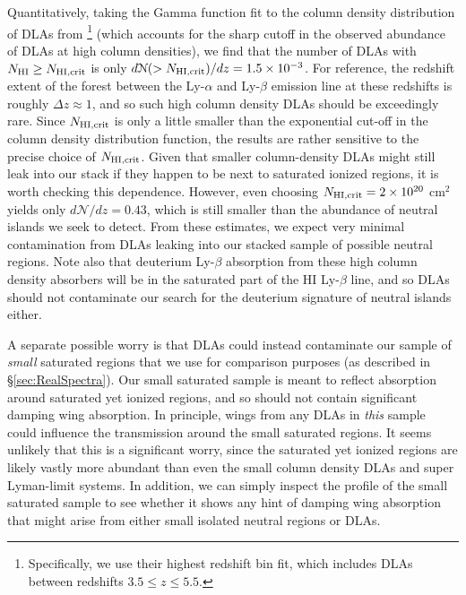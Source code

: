 Quantitatively, taking the Gamma function
fit to the column density distribution of DLAs from \citet{Prochaska:2005wy} \footnote{Specifically, we use their highest redshift bin fit, 
which includes DLAs between redshifts $3.5 \leq z \leq 5.5$.} 
(which accounts for the sharp cutoff in the observed abundance of DLAs
at high column densities), we find that the number of DLAs with $N_{\rm HI} \geq N_{\rm HI, crit}$ is only
$d\mathcal{N}(> N_{\rm HI, crit})/dz = 1.5 \times 10^{-3}$. For reference, the redshift extent of the forest 
between the Ly-$\alpha$ and Ly-$\beta$
emission line at these redshifts is roughly $\Delta z \approx 1$, and so such 
high column density DLAs should be exceedingly rare. Since $N_{\rm HI, crit}$ is
only a little smaller than the exponential
cut-off in the column density distribution function, the results are rather 
sensitive to the precise choice of $N_{\rm HI, crit}$. Given that smaller column-density DLAs might still leak into our stack
if they happen to be next to saturated ionized regions, it is worth checking this dependence.
However, even choosing $N_{\rm HI,crit} = 2 \times 10^{20}$ cm$^2$ yields only $d\mathcal{N}/dz = 0.43$, which is still smaller than the abundance of neutral
islands we seek to detect. 
From these
estimates, we expect very minimal contamination from DLAs leaking into our stacked sample of possible neutral regions.
Note also that deuterium Ly-$\beta$ absorption from these high column density absorbers will be in the saturated
part of the HI Ly-$\beta$ line, and so DLAs should not contaminate our search for the deuterium signature of neutral islands either.


A separate possible worry is that DLAs could instead contaminate our sample of {\em small} saturated regions that
we use for comparison purposes (as described in \S \ref{sec:RealSpectra}). Our small saturated sample
is meant to reflect absorption around saturated yet ionized regions, and so should not contain
significant damping wing absorption. In principle, wings from any DLAs in {\em this} sample could influence the
transmission around the small saturated regions. It seems unlikely that this is a significant worry, since the
saturated yet ionized regions are likely vastly more abundant than even the small column density DLAs and super Lyman-limit systems. 
In addition, we can simply 
inspect the profile of the small saturated sample to see whether it shows any hint of damping wing absorption that
might arise from either small isolated neutral regions or DLAs.

